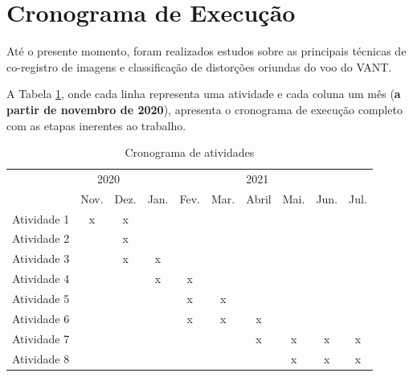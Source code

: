 \documentclass[12pt]{article}
\begin{document}
\section{Cronograma de Execução} 
\label{sec:cronograma}


Até o presente momento, foram realizados estudos sobre as principais técnicas de co-registro de imagens e classificação de distorções oriundas do voo do VANT. 

A Tabela \ref{tab:cronograma}, onde cada linha representa uma atividade e cada coluna um mês (\textbf{a partir de novembro de 2020}), apresenta o cronograma de execução completo com as etapas inerentes ao trabalho.


\begin{table}[!ht]
\caption{Cronograma de atividades}
\centering

\begin{tabular}{c|c|c|c|c|c|c|c|c|c|}
\cline{2-10}
 & \multicolumn{2}{c|}{2020} & \multicolumn{7}{c|}{2021} \\ \cline{2-10} 
 & Nov. & Dez. & Jan. & Fev. & Mar. & Abril & Mai. & Jun. & Jul. \\ \hline
\multicolumn{1}{|c|}{Atividade 1} & x & x &  &  &  &  &  &  &  \\ \hline
\multicolumn{1}{|c|}{Atividade 2} &  & x &  &  &  &  &  &  &  \\ \hline
\multicolumn{1}{|c|}{Atividade 3} &  & x & x &  &  &  &  &  &  \\ \hline
\multicolumn{1}{|c|}{Atividade 4} &  &  & x & x &  &  &  &  &  \\ \hline
\multicolumn{1}{|c|}{Atividade 5} &  &  &  & x & x &  &  &  &  \\ \hline
\multicolumn{1}{|c|}{Atividade 6} &  &  &  & x & x & x &  &  &  \\ \hline
\multicolumn{1}{|c|}{Atividade 7} &  &  &  &  &  & x & x & x & x \\ \hline
\multicolumn{1}{|c|}{Atividade 8} &  &  &  &  &  &  & x & x & x \\ \hline
\end{tabular}
\label{tab:cronograma}
\end{table}
\end{document}
